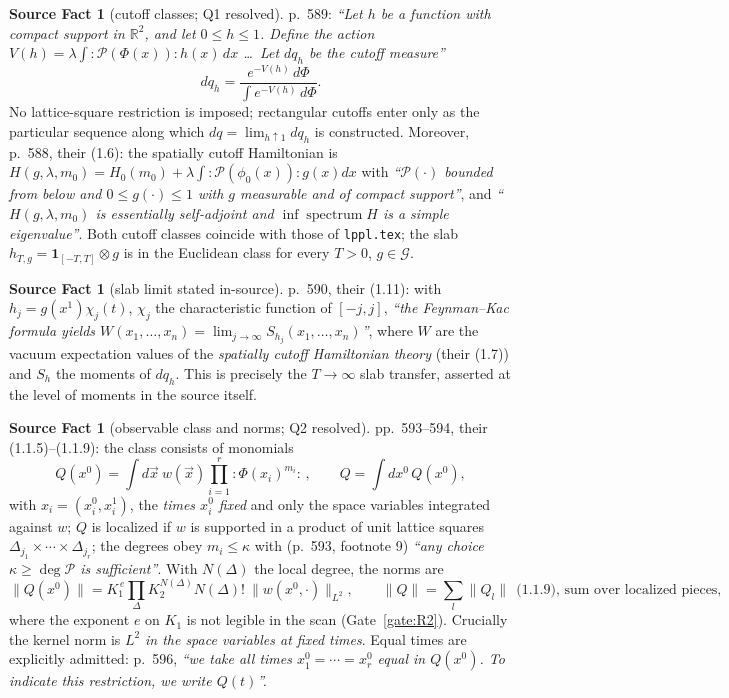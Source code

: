 \documentclass[11pt,a4paper]{article}
\theoremstyle{plain}
\theoremstyle{definition}
\newtheorem{srcfact}[theorem]{Source Fact}
\newcommand{\R}{\mathbb{R}}
\newcommand{\G}{\mathcal{G}}
\begin{document}
\begin{srcfact}[cutoff classes; Q1 resolved]\label{sf:class}
p.~589: \emph{``Let $h$ be a function with compact support in $\R^2$, and let $0\le h\le1$.
Define the action $V(h)=\lambda\int:\mathscr P(\Phi(x)):h(x)\,dx$ \dots\ Let $dq_h$ be the cutoff
measure''}
\[
  dq_h=\frac{e^{-V(h)}\,d\Phi}{\int e^{-V(h)}\,d\Phi}.
\]
No lattice-square restriction is imposed; rectangular cutoffs enter only as the particular
sequence along which $dq=\lim_{h\uparrow1}dq_h$ is constructed. Moreover, p.~588, their (1.6):
the spatially cutoff Hamiltonian is $H(g,\lambda,m_0)=H_0(m_0)+\lambda\int:\mathscr P(\phi_0(x)):g(x)dx$
with \emph{``$\mathscr P(\cdot)$ bounded from below and $0\le g(\cdot)\le1$ with $g$ measurable
and of compact support''}, and \emph{``$H(g,\lambda,m_0)$ is essentially self-adjoint and
$\inf\operatorname{spectrum}H$ is a simple eigenvalue''}. Both cutoff classes coincide with those
of \texttt{lppl.tex}; the slab $h_{T,g}=\mathbf 1_{[-T,T]}\otimes g$ is in the Euclidean class for
every $T>0$, $g\in\G$.
\end{srcfact}

\begin{srcfact}[slab limit stated in-source]\label{sf:slab}
p.~590, their (1.11): with $h_j=g(x^1)\chi_j(t)$, $\chi_j$ the characteristic function of
$[-j,j]$, \emph{``the Feynman--Kac formula yields
$W(x_1,\dots,x_n)=\lim_{j\to\infty}S_{h_j}(x_1,\dots,x_n)$''}, where $W$ are the vacuum
expectation values of the \emph{spatially cutoff Hamiltonian theory} (their (1.7)) and $S_h$ the
moments of $dq_h$. This is precisely the $T\to\infty$ slab transfer, asserted at the level of
moments in the source itself.
\end{srcfact}

\begin{srcfact}[observable class and norms; Q2 resolved]\label{sf:class2}
pp.~593--594, their (1.1.5)--(1.1.9): the class consists of monomials
\[
  Q(x^0)=\int d\vec x\ w(\vec x)\prod_{i=1}^r:\Phi(x_i)^{m_i}:\,,\qquad
  Q=\int dx^0\,Q(x^0),
\]
with $x_i=(x_i^0,x_i^1)$, the \emph{times $x_i^0$ fixed} and only the space variables integrated
against $w$; $Q$ is localized if $w$ is supported in a product of unit lattice squares
$\Delta_{j_1}\times\cdots\times\Delta_{j_r}$; the degrees obey $m_i\le\kappa$ with
(p.~593, footnote 9) \emph{``any choice $\kappa\ge\deg\mathscr P$ is sufficient''}. With
$N(\Delta)$ the local degree, the norms are
\[
  \|Q(x^0)\|=K_1^{\,e}\prod_\Delta K_2^{N(\Delta)}N(\Delta)!\ \|w(x^0,\cdot)\|_{L^2},
  \qquad
  \|Q\|=\sum_l\|Q_l\|\ \ \text{(1.1.9), sum over localized pieces,}
\]
where the exponent $e$ on $K_1$ is not legible in the scan (Gate~\ref{gate:R2}). Crucially the
kernel norm is $L^2$ \emph{in the space variables at fixed times}. Equal times are explicitly
admitted: p.~596, \emph{``we take all times $x^0_{1}=\cdots=x^0_{r}$ equal in $Q(x^0)$. To
indicate this restriction, we write $Q(t)$''.}
\end{srcfact}
\end{document}
